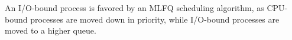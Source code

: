 \documentclass[11pt,largemargins]{homework}
\begin{document}
\clearpage
{}

An I/O-bound process is favored by an MLFQ scheduling algorithm, as CPU-bound
processes are moved down in priority, while I/O-bound processes are moved to a
higher queue.
\end{document}
